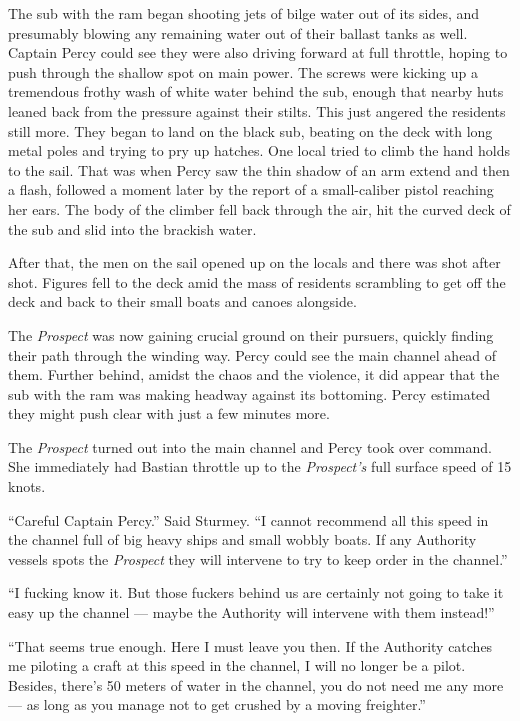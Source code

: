 \documentclass[]{scrbook}
\begin{document}
The sub with the ram began shooting jets of bilge water out of its
sides, and presumably blowing any remaining water out of their ballast
tanks as well. Captain Percy could see they were also driving forward at
full throttle, hoping to push through the shallow spot on main power.
The screws were kicking up a tremendous frothy wash of white water
behind the sub, enough that nearby huts leaned back from the pressure
against their stilts. This just angered the residents still more. They
began to land on the black sub, beating on the deck with long metal
poles and trying to pry up hatches. One local tried to climb the hand
holds to the sail. That was when Percy saw the thin shadow of an arm
extend and then a flash, followed a moment later by the report of a
small-caliber pistol reaching her ears. The body of the climber fell
back through the air, hit the curved deck of the sub and slid into the
brackish water.

After that, the men on the sail opened up on the locals and there was
shot after shot. Figures fell to the deck amid the mass of residents
scrambling to get off the deck and back to their small boats and canoes
alongside.

The \emph{Prospect} was now gaining crucial ground on their pursuers,
quickly finding their path through the winding way. Percy could see the
main channel ahead of them. Further behind, amidst the chaos and the
violence, it did appear that the sub with the ram was making headway
against its bottoming. Percy estimated they might push clear with just a
few minutes more.

The \emph{Prospect} turned out into the main channel and Percy took over
command. She immediately had Bastian throttle up to the
\emph{Prospect's} full surface speed of 15 knots.

``Careful Captain Percy.'' Said Sturmey. ``I cannot recommend all this
speed in the channel full of big heavy ships and small wobbly boats. If
any Authority vessels spots the \emph{Prospect} they will intervene to
try to keep order in the channel.''

``I fucking know it. But those fuckers behind us are certainly not going
to take it easy up the channel --- maybe the Authority will intervene
with them instead!''

``That seems true enough. Here I must leave you then. If the Authority
catches me piloting a craft at this speed in the channel, I will no
longer be a pilot. Besides, there's 50 meters of water in the channel,
you do not need me any more --- as long as you manage not to get crushed
by a moving freighter.''
\end{document}
